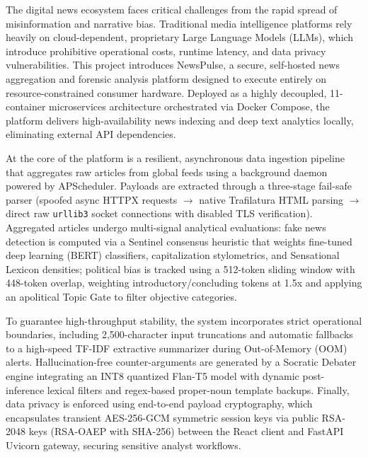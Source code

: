 \documentclass{air-kamra-bs}
\begin{document}
\begin{executiveSummary}
    The digital news ecosystem faces critical challenges from the rapid spread of misinformation and narrative bias. Traditional media intelligence platforms rely heavily on cloud-dependent, proprietary Large Language Models (LLMs), which introduce prohibitive operational costs, runtime latency, and data privacy vulnerabilities. This project introduces NewsPulse, a secure, self-hosted news aggregation and forensic analysis platform designed to execute entirely on resource-constrained consumer hardware. Deployed as a highly decoupled, 11-container microservices architecture orchestrated via Docker Compose, the platform delivers high-availability news indexing and deep text analytics locally, eliminating external API dependencies.

    At the core of the platform is a resilient, asynchronous data ingestion pipeline that aggregates raw articles from global feeds using a background daemon powered by APScheduler. Payloads are extracted through a three-stage fail-safe parser (spoofed async HTTPX requests $\rightarrow$ native Trafilatura HTML parsing $\rightarrow$ direct raw \texttt{urllib3} socket connections with disabled TLS verification). Aggregated articles undergo multi-signal analytical evaluations: fake news detection is computed via a Sentinel consensus heuristic that weights fine-tuned deep learning (BERT) classifiers, capitalization stylometrics, and Sensational Lexicon densities; political bias is tracked using a 512-token sliding window with 448-token overlap, weighting introductory/concluding tokens at 1.5x and applying an apolitical Topic Gate to filter objective categories.

    To guarantee high-throughput stability, the system incorporates strict operational boundaries, including 2,500-character input truncations and automatic fallbacks to a high-speed TF-IDF extractive summarizer during Out-of-Memory (OOM) alerts. Hallucination-free counter-arguments are generated by a Socratic Debater engine integrating an INT8 quantized Flan-T5 model with dynamic post-inference lexical filters and regex-based proper-noun template backups. Finally, data privacy is enforced using end-to-end payload cryptography, which encapsulates transient AES-256-GCM symmetric session keys via public RSA-2048 keys (RSA-OAEP with SHA-256) between the React client and FastAPI Uvicorn gateway, securing sensitive analyst workflows.
\end{executiveSummary}
\end{document}
